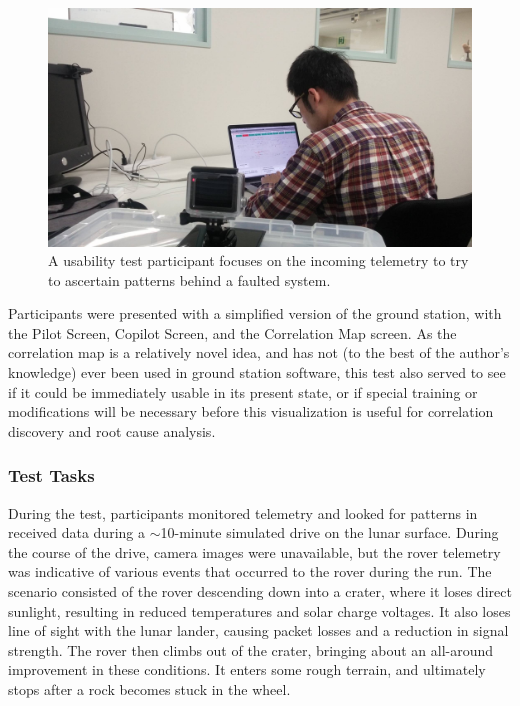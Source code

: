 \begin{figure}[h]
\centering
    \includegraphics[width=\columnwidth]{images/ui_test_takuto.jpg}
    \caption{A usability test participant focuses on the incoming telemetry to try to ascertain patterns behind a faulted system.}
    \label{fig:ui_test_takako}
\end{figure}

Participants were presented with a simplified version of the ground station, with the Pilot Screen, Copilot Screen, and the Correlation Map screen. As the correlation map is a relatively novel idea, and has not (to the best of the author's knowledge) ever been used in ground station software, this test also served to see if it could be immediately usable in its present state, or if special training or modifications will be necessary before this visualization is useful for correlation discovery and root cause analysis.

\subsubsection{Test Tasks}

During the test, participants monitored telemetry and looked for patterns in received data during a $\sim$10-minute simulated drive on the lunar surface. During the course of the drive, camera images were unavailable, but the rover telemetry was indicative of various events that occurred to the rover during the run. The scenario consisted of the rover descending down into a crater, where it loses direct sunlight, resulting in reduced temperatures and solar charge voltages. It also loses line of sight with the lunar lander, causing packet losses and a reduction in signal strength. The rover then climbs out of the crater, bringing about an all-around improvement in these conditions. It enters some rough terrain, and ultimately stops after a rock becomes stuck in the wheel.

